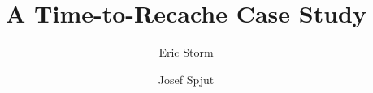 \documentclass[pageno]{jpaper}
\begin{document}
\title{A Time-to-Recache Case Study}

\author{Eric Storm \and Josef Spjut}
\date{}
\maketitle


\begin{abstract}

\end{abstract}











\end{document}
